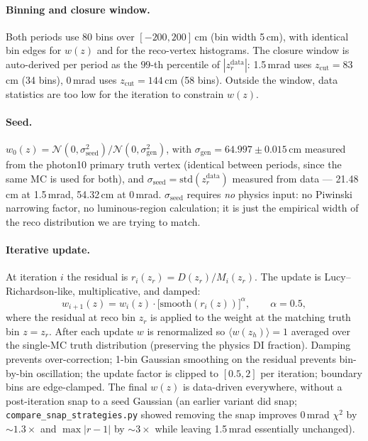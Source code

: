 \documentclass[11pt,a4paper]{article}
\begin{document}
\paragraph{Binning and closure window.}
Both periods use 80 bins over $[-200,200]$\,cm (bin width 5\,cm),
with identical bin edges for $w(z)$ and for the reco-vertex
histograms. The closure window is auto-derived per period as the
$99$-th percentile of $|z_r^\mathrm{data}|$:
1.5\,mrad uses $z_\mathrm{cut}=83$\,cm (34 bins), 0\,mrad uses
$z_\mathrm{cut}=144$\,cm (58 bins). Outside the window, data
statistics are too low for the iteration to constrain $w(z)$.

\paragraph{Seed.}
$w_0(z)=\mathcal{N}(0,\sigma_\mathrm{seed}^2)/\mathcal{N}(0,\sigma_\mathrm{gen}^2)$,
with $\sigma_\mathrm{gen} = 64.997\pm 0.015$\,cm measured from
the photon10 primary truth vertex (identical between periods, since
the same MC is used for both), and
$\sigma_\mathrm{seed}=\mathrm{std}(z_r^\mathrm{data})$ measured
from data --- 21.48\,cm at 1.5\,mrad, 54.32\,cm at 0\,mrad.
$\sigma_\mathrm{seed}$ requires \emph{no} physics input: no
Piwinski narrowing factor, no luminous-region calculation; it is
just the empirical width of the reco distribution we are trying to
match.

\paragraph{Iterative update.}
At iteration $i$ the residual is $r_i(z_r)=D(z_r)/M_i(z_r)$. The
update is Lucy--Richardson-like, multiplicative, and damped:
\begin{equation}
w_{i+1}(z) = w_i(z) \cdot \bigl[\mathrm{smooth}(r_i(z))\bigr]^{\alpha},
\qquad \alpha = 0.5,
\end{equation}
where the residual at reco bin $z_r$ is applied to the weight at
the matching truth bin $z=z_r$. After each update $w$ is
renormalized so $\langle w(z_h)\rangle=1$ averaged over the
single-MC truth distribution (preserving the physics DI fraction).
Damping prevents over-correction; 1-bin Gaussian smoothing on the
residual prevents bin-by-bin oscillation; the update factor is
clipped to $[0.5,2]$ per iteration; boundary bins are edge-clamped.
The final $w(z)$ is data-driven everywhere, without a
post-iteration snap to a seed Gaussian (an earlier variant did
snap; \texttt{compare\_snap\_strategies.py} showed removing the
snap improves 0\,mrad $\chi^2$ by $\sim\!1.3\times$ and
$\max|r-1|$ by $\sim\!3\times$ while leaving 1.5\,mrad essentially
unchanged).
\end{document}
